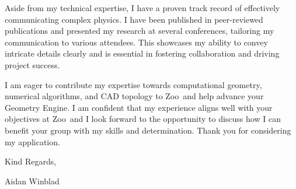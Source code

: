 \documentclass[12pt]{letter}
\newcommand{\myname}{Aidan Winblad} %
\newcommand{\mytitle}{Applicant} %
\newcommand{\closer}{Kind Regards} %
\newcommand{\company}{Zoo} %
\begin{document}
Aside from my technical expertise, I have a proven track record of effectively communicating complex physics.
I have been published in peer-reviewed publications and presented my research at several conferences, tailoring my communication to various attendees.
This showcases my ability to convey intricate details clearly and is essential in fostering collaboration and driving project success.

I am eager to contribute my expertise towards computational geometry, numerical algorithms, and CAD topology to \company\ and help advance your Geometry Engine.
I am confident that my experience aligns well with your objectives at \company\, and I look forward to the opportunity to discuss how I can benefit your group with my skills and determination. Thank you for considering my application.

\vspace{0.1in}
\vfill

\begin{flushright}
\closer,

\myname\\
\end{flushright}
\end{document}
